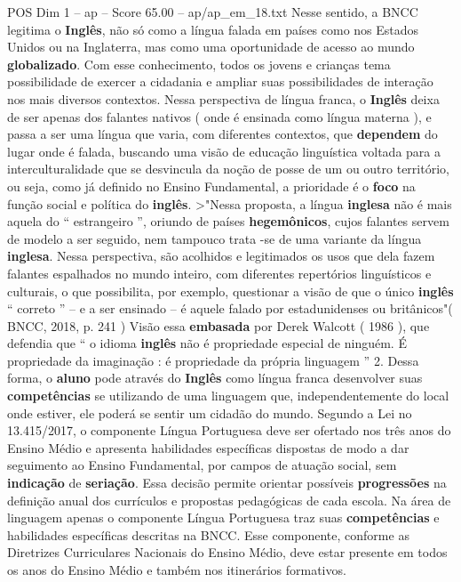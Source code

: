 \begin{textsample}{POS Dim 1 – ap – Score 65.00 – ap/ap\_em\_18.txt}
Nesse sentido, a BNCC legitima o \textbf{Inglês}, não só como a língua falada em países como nos Estados Unidos ou na Inglaterra, mas como uma oportunidade de acesso ao mundo \textbf{globalizado}.
Com esse conhecimento, todos os jovens e crianças tema possibilidade de exercer a cidadania e ampliar suas possibilidades de interação nos mais diversos contextos.
Nessa perspectiva de língua franca, o \textbf{Inglês} deixa de ser apenas dos falantes nativos ( onde é ensinada como língua materna ), e passa a ser uma língua que varia, com diferentes contextos, que \textbf{dependem} do lugar onde é falada, buscando uma visão de educação linguística voltada para a interculturalidade que se desvincula da noção de posse de um ou outro território, ou seja, como já definido no Ensino Fundamental, a prioridade é o \textbf{foco} na função social e política do \textbf{inglês}. >"Nessa proposta, a língua \textbf{inglesa} não é mais aquela do “ estrangeiro ”, oriundo de países \textbf{hegemônicos}, cujos falantes servem de modelo a ser seguido, nem tampouco trata -se de uma variante da língua \textbf{inglesa}.
Nessa perspectiva, são acolhidos e legitimados os usos que dela fazem falantes espalhados no mundo inteiro, com diferentes repertórios linguísticos e culturais, o que possibilita, por exemplo, questionar a visão de que o único \textbf{inglês} “ correto ” – e a ser ensinado – é aquele falado por estadunidenses ou britânicos"( BNCC, 2018, p. 241 ) Visão essa \textbf{embasada} por Derek Walcott ( 1986 ), que defendia que “ o idioma \textbf{inglês} não é propriedade especial de ninguém.
É propriedade da imaginação : é propriedade da própria linguagem ” 2.
Dessa forma, o \textbf{aluno} pode através do \textbf{Inglês} como língua franca desenvolver suas \textbf{competências} se utilizando de uma linguagem que, independentemente do local onde estiver, ele poderá se sentir um cidadão do mundo.
Segundo a Lei no 13.415/2017, o componente Língua Portuguesa deve ser ofertado nos três anos do Ensino Médio e apresenta habilidades específicas dispostas de modo a dar seguimento ao Ensino Fundamental, por campos de atuação social, sem \textbf{indicação} de \textbf{seriação}.
Essa decisão permite orientar possíveis \textbf{progressões} na definição anual dos currículos e propostas pedagógicas de cada escola.
Na área de linguagem apenas o componente Língua Portuguesa traz suas \textbf{competências} e habilidades específicas descritas na BNCC.
Esse componente, conforme as Diretrizes Curriculares Nacionais do Ensino Médio, deve estar presente em todos os anos do Ensino Médio e também nos itinerários formativos.

\end{textsample}
